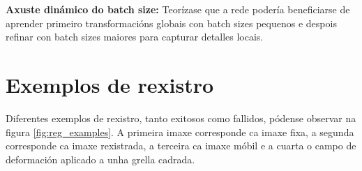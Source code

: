 \textbf{Axuste dinámico do batch size:} Teorízase que a rede podería beneficiarse de aprender primeiro transformacións globais con batch sizes pequenos e despois refinar con batch sizes maiores para capturar detalles locais.



\section{Exemplos de rexistro}
\label{sec:Exemplos de rexistro}

Diferentes exemplos de rexistro, tanto exitosos como fallidos, pódense observar na figura \ref{fig:reg_examples}.
A primeira imaxe corresponde ca imaxe fixa, a segunda corresponde ca imaxe rexistrada, a terceira ca imaxe móbil e a cuarta o campo de deformación aplicado a unha grella cadrada.
 
